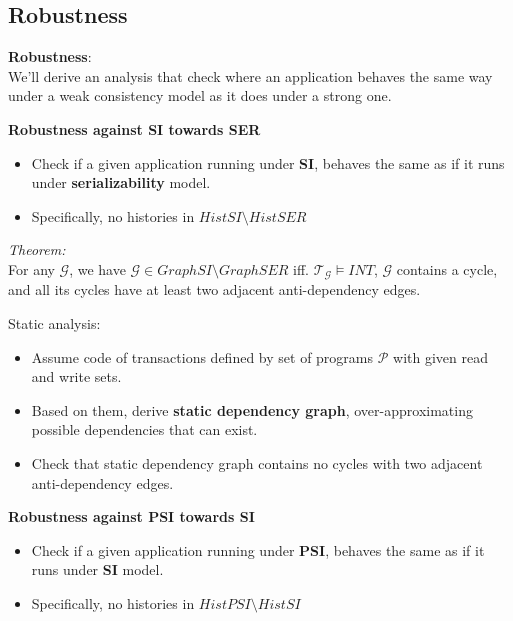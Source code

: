 \documentclass{beamer}
\begin{document}
\subsection{Robustness}

\begin{frame}
	\textbf{Robustness}: \\
	We'll derive an analysis that check where an application behaves the same way under a weak consistency model as it does under a strong one.
\end{frame}

\begin{frame}
	\textbf{Robustness against SI towards SER} \\
	\begin{itemize}
		\item Check if a given application running under \textbf{SI}, behaves the same as if it runs under \textbf{serializability} model.
		\item Specifically, no histories in $HistSI \setminus HistSER$
	\end{itemize}
\end{frame}

\begin{frame}
	\textit{Theorem:} \\
	For any $\mathcal{G}$, we have $\mathcal{G} \in GraphSI \setminus GraphSER $ iff. $\mathcal{T}_\mathcal{G} \vDash INT$, $\mathcal{G}$ contains a cycle, and all its cycles have at least two adjacent anti-dependency edges.
\end{frame}

\begin{frame}
	Static analysis:
	\begin{itemize}
		\item Assume code of transactions defined by set of programs $\mathcal{P}$ with given read and write sets.
		\item Based on them, derive \textbf{static dependency graph}, over-approximating possible dependencies that can exist.
		\item Check that static dependency graph contains no cycles with two adjacent anti-dependency edges.
	\end{itemize}
\end{frame}


\begin{frame}
	\textbf{Robustness against PSI towards SI} \\
	\begin{itemize}
		\item Check if a given application running under \textbf{PSI}, behaves the same as if it runs under \textbf{SI} model.
		\item Specifically, no histories in $HistPSI \setminus HistSI$
	\end{itemize}
\end{frame}
\end{document}
